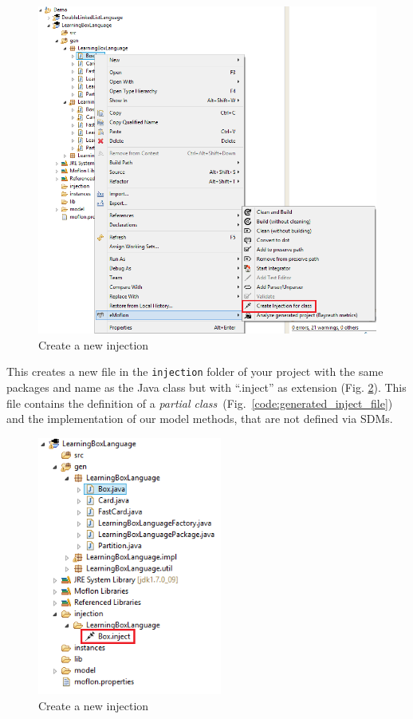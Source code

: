 \begin{enumerate}
    \begin{figure}[htbp]
        \centering
        \includegraphics[width=\textwidth]{pics/injectionBilder/create_injection_context_menu.png}
        \caption{Create a new injection}
        \label{fig:injection_create_injection}
    \end{figure}

    This creates a new file in the \texttt{injection} folder of your project with the same packages and name as the Java class but with ``.inject'' as extension (Fig. \ref{fig:injection_created_injection_file}). This file contains the definition of a \textit{partial class}~(Fig.~\ref{code:generated_inject_file}) and the implementation of our model methods, that are not defined via SDMs.

    \begin{figure}[htbp]
        \centering
        \includegraphics[width=0.54\textwidth]{pics/injectionBilder/newly_created_injection_file.png}
        \caption{Create a new injection}
        \label{fig:injection_created_injection_file}
    \end{figure}
    \FloatBarrier


\end{enumerate}
